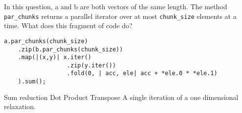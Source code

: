 %
%
In this question, a and b are both vectors of the same length. The method \texttt{par\_chunks} returns a parallel iterator over at most \texttt{chunk\_size} elements at a time. What does this fragment of code do?
\begin{lstlisting}
a.par_chunks(chunk_size)
    .zip(b.par_chunks(chunk_size))
    .map(|(x,y)| x.iter()
                  .zip(y.iter())
                  .fold(0, | acc, ele| acc + *ele.0 * *ele.1)
    ).sum();

\end{lstlisting}

\choice Sum reduction
\choice Dot Product
\choice Transpose
\choice A single iteration of a one dimensional relaxation.

